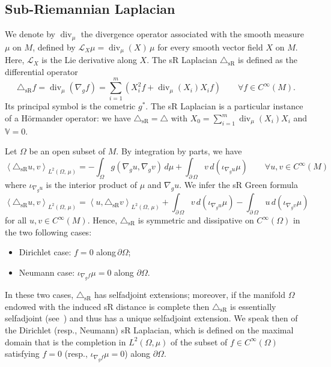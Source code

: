 \documentclass[10pt]{amsart}
\theoremstyle{definition}\newtheorem{defi}[theo]{Definition}\newtheorem{rema}[theo]{Remark}\newtheorem{exam}[theo]{Example}\newtheorem{exem}[theo]{Example}\newtheorem{nota}[theo]{Notation}
\newcommand{\bbV}{\mathbb{V}}
\newcommand{\calL}{\mathcal{L}}
\DeclareMathOperator{\divl}{div}
\newcommand{\trianglesR}{\triangle_{\mathrm{sR}}}
\let\oldforall\forall
\renewcommand*{\forall}{\mathrel{\oldforall}}
\begin{document}
\subsection{Sub-Riemannian Laplacian}\label{sec_sRLaplacian}
We denote by $\divl_\mu$ the divergence operator associated with the smooth measure $\mu$ on $M$, defined by $\calL_X \mu=\divl_\mu(X)\, \mu$ for every smooth vector field $X$ on $M$. Here, $\calL_X$ is the Lie derivative along $X$. The sR Laplacian $\trianglesR$ is defined as the differential operator
\begin{equation}\label{def_DeltasR}
\trianglesR f = \divl_\mu\left(\nabla_g f\right) = \sum_{i=1}^m \left(X_i^2f + \divl_\mu(X_i)X_if \right) \qquad \forall f\in C^\infty(M).
\end{equation}
Its principal symbol is the cometric $g^*$. The sR Laplacian is a particular instance of a H\"ormander operator: we have $\trianglesR=\triangle$ with $X_0 = \sum_{i=1}^m \divl_\mu(X_i)X_i$ and $\bbV=0$.

Let $\Omega$ be an open subset of $M$. By integration by parts, we have
\[
\left\langle \trianglesR u,v\right\rangle_{L^2(\Omega,\,\mu)} = - \int_\Omega g\left(\nabla_g u,\nabla_g v\right)\, d\mu + \int_{\partial\,\Omega} v\, d\left(\iota_{\nabla_gu}\mu\right) \qquad \forall u,v\in C^\infty(M)
\]
where $\iota_{\nabla_gu}$ is the interior product of $\mu$ and $\nabla_gu$. We infer the sR Green formula
\[
\left\langle \trianglesR u,v\right\rangle_{L^2(\Omega,\,\mu)} = \left\langle u,\trianglesR v\right\rangle_{L^2(\Omega,\,\mu)} + \int_{\partial\,\Omega} v\, d\left(\iota_{\nabla_gu}\mu\right) - \int_{\partial\,\Omega} u\, d\left(\iota_{\nabla_gv} \mu\right)
\]
for all $u,v\in C^\infty(M)$. Hence, $\trianglesR$ is symmetric and dissipative on $C^\infty(\Omega)$ in the two following cases:
\begin{itemize}
\item Dirichlet case: $f=0$ along\,$\partial\Omega$;
\item Neumann case: $\iota_{\nabla_gf}\mu=0$ along $\partial\Omega$.
\end{itemize}
In these two cases, $\trianglesR$ has selfadjoint extensions; moreover, if the manifold $\Omega$ endowed with the induced sR distance is complete then $\trianglesR$ is essentially selfadjoint (see~\cite{Strichartz_JDG1986}) and thus has a unique selfadjoint extension. We speak then of the Dirichlet (resp., Neumann) sR Laplacian, which is defined on the maximal domain that is the completion in $L^2(\Omega,\mu)$ of the subset of $f\in C^\infty(\Omega)$ satisfying $f=0$ (resp., $\iota_{\nabla_gf}\mu=0$) along $\partial\Omega$.
\end{document}
